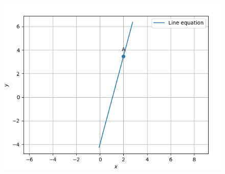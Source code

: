 \documentclass[12pt]{article}
\begin{document}
\begin{enumerate}
                  \begin{figure}[!h]
	\begin{center} 
	    \includegraphics[width=\columnwidth]{./figs/line.png}
	\end{center}
\caption{}
\label{fig:Fig}
\end{figure}
	

\end{enumerate}
\end{document}
